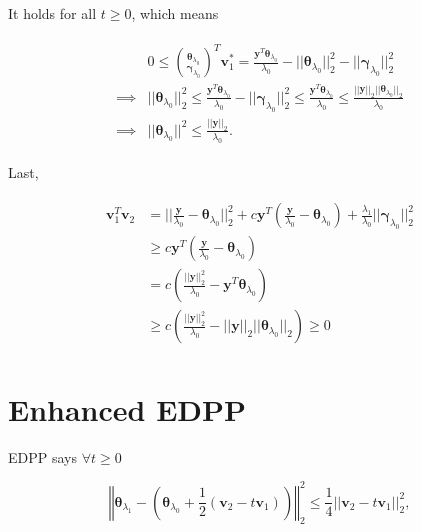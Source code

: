 It holds for all $t\geq 0$, which means

\begin{gather}
    \begin{aligned}
        &0\leq\binom{\boldsymbol\theta_{\lambda_0}}{\boldsymbol\gamma_{\lambda_0}}^T\boldsymbol v_1^*=\frac{\boldsymbol y^T\boldsymbol\theta_{\lambda_0}}{\lambda_0}-||\boldsymbol\theta_{\lambda_0}||_2^2-||\boldsymbol\gamma_{\lambda_0}||_2^2\\
        \implies&||\boldsymbol\theta_{\lambda_0}||^2_2\leq\frac{\boldsymbol y^T\boldsymbol\theta_{\lambda_0}}{\lambda_0}-||\boldsymbol\gamma_{\lambda_0}||_2^2\leq\frac{\boldsymbol y^T\boldsymbol\theta_{\lambda_0}}{\lambda_0}\leq \frac{||\boldsymbol y||_2||\boldsymbol\theta_{\lambda_0}||_2}{\lambda_0}\\
        \implies&||\boldsymbol\theta_{\lambda_0}||^2\leq\frac{||\boldsymbol y||_2}{\lambda_0}.
    \end{aligned}
\end{gather}

Last,

\begin{gather}
    \begin{aligned}
        \boldsymbol v_1^T\boldsymbol v_2&=||\frac{\boldsymbol y}{\lambda_0}-\boldsymbol\theta_{\lambda_0}||_2^2+c\boldsymbol y^T(\frac{\boldsymbol y}{\lambda_0}-\boldsymbol\theta_{\lambda_0})+\frac{\lambda_1}{\lambda_0}||\boldsymbol\gamma_{\lambda_0}||_2^2\\
        &\geq c\boldsymbol y^T(\frac{\boldsymbol y}{\lambda_0}-\boldsymbol\theta_{\lambda_0})\\
        &=c\left(\frac{||\boldsymbol y||_2^2}{\lambda_0}-\boldsymbol y^T\boldsymbol\theta_{\lambda_0}\right)\\
        &\geq c\left(\frac{||\boldsymbol y||_2^2}{\lambda_0}-||\boldsymbol y||_2||\boldsymbol\theta_{\lambda_0}||_2\right)\geq 0
    \end{aligned}
\end{gather}


\section{Enhanced EDPP}

EDPP says $\forall t\geq 0$

\begin{equation}
    \left\Vert\boldsymbol\theta_{\lambda_1}-\left(\boldsymbol\theta_{\lambda_0}+\frac{1}{2}(\boldsymbol v_2-t\boldsymbol v_1)\right)\right\Vert_2^2\leq\frac{1}{4}||\boldsymbol v_2-t\boldsymbol v_1||_2^2,
\end{equation}


